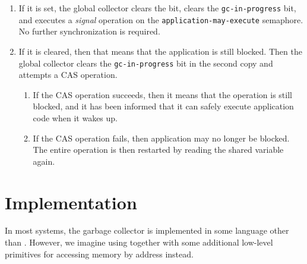 \begin{enumerate}
\item If it is set, the global collector clears the bit, clears the
  \texttt{gc-in-progress} bit, and executes a \emph{signal} operation
  on the \texttt{application-may-execute} semaphore.  No further
  synchronization is required.
\item  If it is cleared, then that means that the application is still
  blocked.  Then the global collector clears the
  \texttt{gc-in-progress} bit in the second copy and attempts a CAS
  operation.
  \begin{enumerate}
  \item If the CAS operation succeeds, then it means that the
    operation is still blocked, and it has been informed that it can
    safely execute application code when it wakes up.
  \item If the CAS operation fails, then application may no longer be
    blocked.  The entire operation is then restarted by reading the
    shared variable again.
  \end{enumerate}
\end{enumerate}

\section{Implementation}

In most systems, the garbage collector is implemented in some language
other than \commonlisp{}.  However, we imagine using \commonlisp{}
together with some additional low-level primitives for accessing
memory by address instead.

